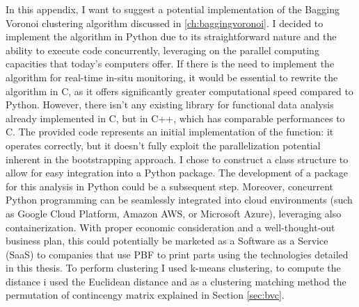 In this appendix, I want to suggest a potential implementation of the Bagging Voronoi clustering algorithm discussed in \ref{ch:baggingvoronoi}. I decided to implement the algorithm in Python due to its straightforward nature and the ability to execute code concurrently, leveraging on the parallel computing capacities that today's computers offer. If there is the need to implement the algorithm for real-time in-situ monitoring, it would be essential to rewrite the algorithm in C, as it offers significantly greater computational speed compared to Python. However, there isn't any existing library for functional data analysis already implemented in C, but in C++, which has comparable performances to C. The provided code represents an initial implementation of the function: it operates correctly, but it doesn't fully exploit the parallelization potential inherent in the bootstrapping approach. I chose to construct a class structure to allow for easy integration into a Python package. The development of a package for this analysis in Python could be a subsequent step. Moreover, concurrent Python programming can be seamlessly integrated into cloud environments (such as Google Cloud Platform, Amazon AWS, or Microsoft Azure), leveraging also containerization. With proper economic consideration and a well-thought-out business plan, this could potentially be marketed as a Software as a Service (SaaS) to companies that use PBF to print parts using the technologies detailed in this thesis. To perform clustering I used k-means clustering, to compute the distance i used the Euclidean distance and as a clustering matching method the permutation of contincengy matrix explained in Section \ref{sec:bvc}.
%